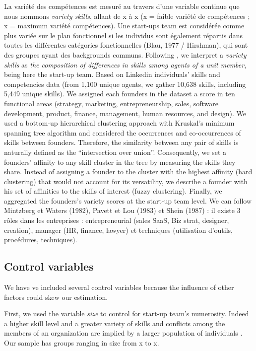\documentclass[12pt]{article}
\begin{document}
La variété des compétences est mesuré au travers d'une variable continue que nous nommons \textit{variety skills}, allant de x à x (x = faible variété de compétences ; x = maximum variété compétences). Une start-ups team est considérée comme plus variée sur le plan fonctionnel si les individus sont également répartis dans toutes les différentes catégories fonctionnelles (Blau, 1977 / Hirshman), qui sont des groupes ayant des backgrounds communs. Following \citet{harrison2007s}, we interpret a \textit{variety skills} as \textit{the composition of differences in skills among agents of a unit member}, being here the start-up team. Based on Linkedin individuals' skills and competencies data (from 1,100 unique agents, we gather 10,638 skills, including 5,449 unique skills). We assigned each founders in the dataset a score in ten functional areas (strategy, marketing, entrepreneurship, sales, software development, product, finance, management, human resources, and design). We used a bottom-up hierarchical clustering approach with Kruskal's minimum spanning tree algorithm \citep{kruskal1956shortest} and considered the occurrences and co-occurrences of skills between founders. Therefore, the similarity between any pair of skills is naturally defined as the “intersection over union”. Consequently, we set a founders' affinity to any skill cluster in the tree by measuring the skills they share. Instead of assigning a founder to the cluster with the highest affinity (hard clustering) that would not account for its versatility, we describe a founder with his set of affinities to the skills of interest (fuzzy clustering). Finally, we aggregated the founders's variety scores at the start-up team level. We can follow Mintzberg et Waters (1982), Pavett et Lou (1983) et Shein (1987) : il existe 3 rôles dans les entreprises : entrepreneurial (sales SaaS, Biz strat, designer, creation), manager (HR, finance, lawyer) et techniques (utilisation d'outils, procédures, techniques).

\subsection{Control variables}

We have ve included several control variables because the influence of other factors could skew our estimation.

First, we used the variable \textit{size} to control for start-up team's numerosity. Indeed a higher skill level and a greater variety of skills and conflicts among the members of an organization are implied by a larger population of individuals \citep{eisenhardt1990organizational}. Our sample has groups ranging in size from x to x.
\end{document}
